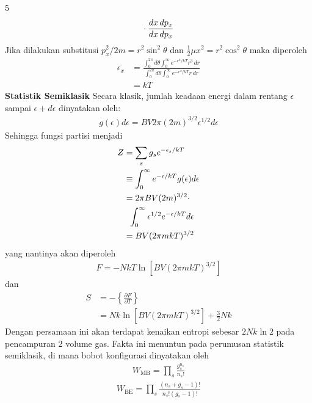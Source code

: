 \documentclass[a4paper  , 6 pt]{article}
\begin{document}
\begin{tiny}
\begin{multicols} {5}
\begin{align}
& \hspace{0.3 cm }\cdot \frac{ dx \, dp_x}{dx \, dp_x}
\end{align}
Jika dilakukan substitusi $p_x^2 /2m  = r^2 \sin^2 \theta $ dan $\frac{1}{2} \mu x^2 = r^2 \cos^2 \theta $ maka diperoleh
\begin{align}
\overline{\epsilon_x} &= \frac{\int_{0}^{2 \pi } d\theta \int_{0}^{\infty} e^{-r^2 /kT} r^3 \, dr }{\int_{0}^{2 \pi} d \theta \int_{0}^{\infty} e^{- r^2 /kT} r \, dr }
\nonumber \\
& = kT \nonumber
\end{align} \newline
\textbf{Statistik Semiklasik} \newline
Secara klasik, jumlah keadaan energi dalam rentang $\epsilon $ sampai $\epsilon + d \epsilon $ dinyatakan oleh:
\begin{align}
g(\epsilon ) d\epsilon = BV 2\pi (2m )^{3/2 }\epsilon^{1/2} d\epsilon  
\end{align}
Sehingga fungsi partisi menjadi
\begin{align}
Z& = \sum_s g_s e^{-\epsilon_s /kT} \nonumber \\&  \equiv \int_{0}^{\infty} e^{-\epsilon/kT } g(\epsilon ) d \epsilon \nonumber  \\
& = 2\pi BV (2m)^{3/2 } \cdot \nonumber \\
& \hspace{0.2 cm } \int_{0}^{\infty} \epsilon^{1/2} e^{-\epsilon /kT} d \epsilon  \nonumber \\ & = BV (2 \pi mkT)^{3/2 } 
\end{align}
yang nantinya akan diperoleh
\begin{align}
F = - Nk T \ln [BV (2 \pi mkT)^{3/2}]  
\end{align} 
dan 
\begin{align}
S &= - \left \lbrace  \frac{\partial F}{\partial T}\right \rbrace  \nonumber  \\
& =\boxed{ Nk \ln [BV (2 \pi mkT )^{3/2 }]+  \frac{3}{2} Nk  }
\end{align}
Dengan persamaan ini akan terdapat kenaikan entropi sebesar $2 Nk \ln 2$ pada pencampuran 2 volume gas.
Fakta ini menuntun pada perumusan statistik semiklasik, di mana bobot konfigurasi dinyatakan oleh 
\begin{align}
W_\mathrm{MB} = \prod_s  \frac{g_s^{n_s}}{n_s !} \label{boltzmann-semiklasik}
\end{align}
\begin{align}
W_\mathrm{BE} = \prod_s \frac{(n_s + g_s -1)!}{n_s ! (g_s - 1)!} 

\end{align}
\end{multicols}
\end{tiny}
\end{document}
